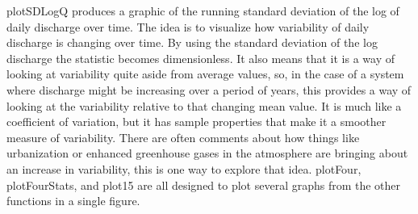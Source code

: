 \documentclass[a4paper,11pt]{article}\usepackage[]{graphicx}\usepackage[]{color}
\begin{document}
plotSDLogQ produces a graphic of the running standard deviation of the log of daily discharge over time.  The idea is to visualize how variability of daily discharge is changing over time.  By using the standard deviation of the log discharge the statistic becomes dimensionless.  It also means that it is a way of looking at variability quite aside from average values, so, in the case of a system where discharge might be increasing over a period of years, this provides a way of looking at the variability relative to that changing mean value.  It is much like a coefficient of variation, but it has sample properties that make it a smoother measure of variability.  There are often comments about how things like urbanization or enhanced greenhouse gases in the atmosphere are bringing about an increase in variability, this is one way to explore that idea. plotFour, plotFourStats, and plot15 are all designed to plot several graphs from the other functions in a single figure. 
\end{document}
